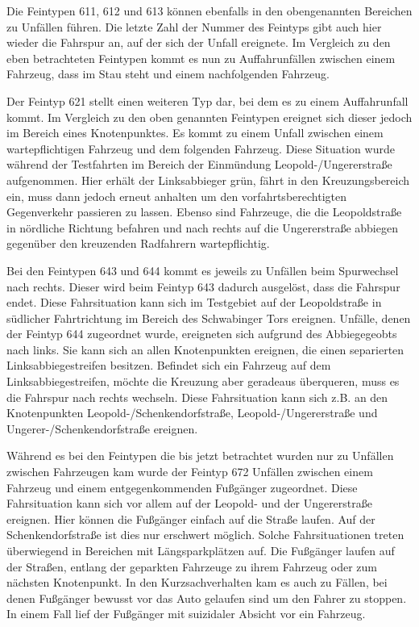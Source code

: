 Die Feintypen 611, 612 und 613 können ebenfalls in den obengenannten Bereichen zu Unfällen führen. Die letzte Zahl der Nummer des Feintyps gibt auch hier wieder die Fahrspur an, auf der sich der Unfall ereignete. Im Vergleich zu den eben betrachteten Feintypen kommt es nun zu Auffahrunfällen zwischen einem Fahrzeug, dass im Stau steht und einem nachfolgenden Fahrzeug.   

Der Feintyp 621 stellt einen weiteren Typ dar, bei dem es zu einem Auffahrunfall kommt. Im Vergleich zu den oben genannten Feintypen ereignet sich dieser jedoch im Bereich eines Knotenpunktes. Es kommt zu einem Unfall zwischen einem wartepflichtigen Fahrzeug und dem folgenden Fahrzeug. Diese Situation wurde während der Testfahrten im Bereich der Einmündung Leopold-/Ungererstraße aufgenommen. Hier erhält der Linksabbieger grün, fährt in den Kreuzungsbereich ein, muss dann jedoch erneut anhalten um den vorfahrtsberechtigten Gegenverkehr passieren zu lassen. Ebenso sind Fahrzeuge, die die Leopoldstraße in nördliche Richtung befahren und nach rechts auf die Ungererstraße abbiegen gegenüber den kreuzenden Radfahrern wartepflichtig.

Bei den Feintypen 643 und 644 kommt es jeweils zu Unfällen beim Spurwechsel nach rechts. Dieser wird beim Feintyp 643 dadurch ausgelöst, dass die Fahrspur endet. Diese Fahrsituation kann sich im Testgebiet auf der Leopoldstraße in südlicher Fahrtrichtung im Bereich des Schwabinger Tors ereignen. Unfälle, denen der Feintyp 644 zugeordnet wurde, ereigneten sich aufgrund des Abbiegegeobts nach links. Sie kann sich an allen Knotenpunkten ereignen, die einen separierten Linksabbiegestreifen besitzen. Befindet sich ein Fahrzeug auf dem Linksabbiegestreifen, möchte die Kreuzung aber geradeaus überqueren, muss es die Fahrspur nach rechts wechseln. Diese Fahrsituation kann sich z.B. an den Knotenpunkten Leopold-/Schenkendorfstraße, Leopold-/Ungererstraße und Ungerer-/Schenkendorfstraße ereignen.

Während es bei den Feintypen die bis jetzt betrachtet wurden nur zu Unfällen zwischen Fahrzeugen kam wurde der Feintyp 672 Unfällen zwischen einem Fahrzeug und einem entgegenkommenden Fußgänger zugeordnet. Diese Fahrsituation kann sich vor allem auf der Leopold- und der Ungererstraße ereignen. Hier können die Fußgänger einfach auf die Straße laufen. Auf der Schenkendorfstraße ist dies nur erschwert möglich. Solche Fahrsituationen treten überwiegend in Bereichen mit Längsparkplätzen auf. Die Fußgänger laufen auf der Straßen, entlang der geparkten Fahrzeuge zu ihrem Fahrzeug oder zum nächsten Knotenpunkt. In den Kurzsachverhalten kam es auch zu Fällen, bei denen Fußgänger bewusst vor das Auto gelaufen sind um den Fahrer zu stoppen. In einem Fall lief der Fußgänger mit suizidaler Absicht vor ein Fahrzeug.

